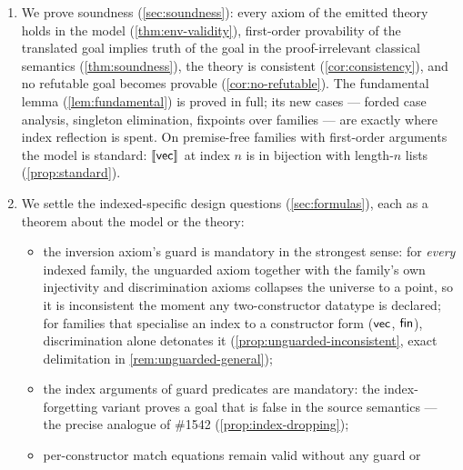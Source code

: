 \begin{enumerate}[leftmargin=2em]
  the set of closed $\lbox$ terms modulo conversion, junk included; an
  indexed family denotes a set of (index-tuple, element) pairs built in
  stages.  The key new lemma is \emph{index reflection}
  (\cref{lem:index-reflection}): every member of the interpretation
  decomposes uniquely as a constructor form whose index tuple equals the
  denotation of the constructor's index terms --- the semantic content of
  fording, and the point where the model validates what uniqueness of
  identity proofs validates in type theory.  Ranks become element ranks,
  which index reflection makes well defined.
\item We prove soundness (\cref{sec:soundness}): every axiom of the
  emitted theory holds in the model (\cref{thm:env-validity}), first-order
  provability of the translated goal implies truth of the goal in the
  proof-irrelevant classical semantics (\cref{thm:soundness}), the theory
  is consistent (\cref{cor:consistency}), and no refutable goal becomes
  provable (\cref{cor:no-refutable}).  The fundamental lemma
  (\cref{lem:fundamental}) is proved in full; its new cases --- forded
  case analysis, singleton elimination, fixpoints over families --- are
  exactly where index reflection is spent.  On premise-free families with
  first-order arguments the model is standard: $[\![ \mathsf{vec} ]\!]_{}$ at index
  $n$ is in bijection with length-$n$ lists (\cref{prop:standard}).
\item We settle the indexed-specific design questions
  (\cref{sec:formulas}), each as a theorem about the model or the theory:
  \begin{itemize}
  \item the inversion axiom's guard is mandatory in the strongest
    sense: for \emph{every} indexed family, the unguarded axiom
    together with the family's own injectivity and discrimination
    axioms collapses the universe to a point, so it is inconsistent
    the moment any two-constructor datatype is declared; for families
    that specialise an index to a constructor form ($\mathsf{vec}$, $\mathsf{fin}$),
    discrimination alone detonates it
    (\cref{prop:unguarded-inconsistent}, exact delimitation in
    \cref{rem:unguarded-general});
  \item the index arguments of guard predicates are mandatory: the
    index-forgetting variant proves a goal that is false in the source
    semantics --- the precise analogue of \fstar{} \#1542
    (\cref{prop:index-dropping});
  \item per-constructor match equations remain valid without any guard or

\end{itemize}
\end{enumerate}
